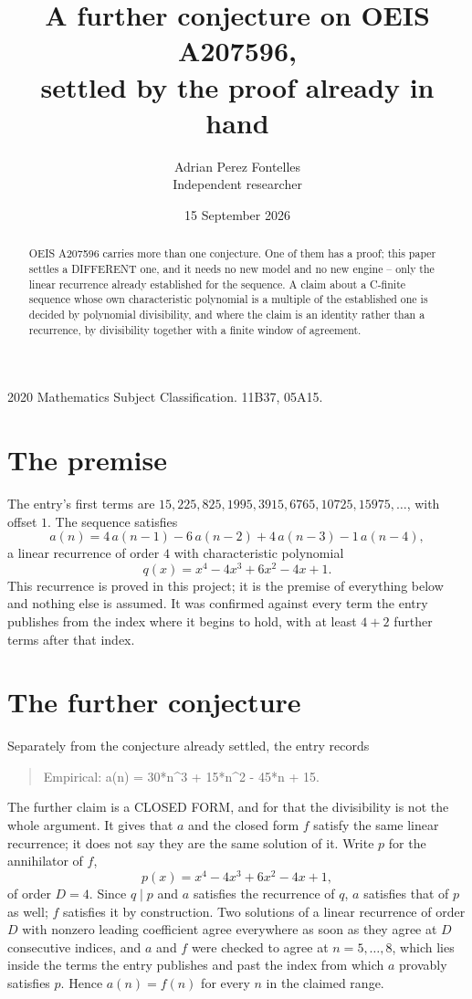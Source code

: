 \documentclass[11pt,a4paper]{article}
\title{A further conjecture on OEIS A207596,\\ \large settled by the proof already in hand}
\author{Adrian Perez Fontelles\\ \small Independent researcher}
\date{15 September 2026}
\theoremstyle{plain}
\theoremstyle{definition}
\begin{document}
\maketitle

\begin{abstract}
OEIS A207596 carries more than one conjecture. One of them has a proof; this paper settles a
DIFFERENT one, and it needs no new model and no new engine -- only the linear recurrence already
established for the sequence. A claim about a C-finite sequence whose own characteristic
polynomial is a multiple of the established one is decided by polynomial divisibility, and where
the claim is an identity rather than a recurrence, by divisibility together with a finite window
of agreement.
\end{abstract}

\noindent\small 2020 Mathematics Subject Classification. 11B37, 05A15.\normalsize

\section{The premise}

The entry's first terms are $15, 225, 825, 1995, 3915, 6765, 10725, 15975,\dots$, with offset $1$. The sequence satisfies
\[
  a(n)=4\,a(n-1) - 6\,a(n-2) + 4\,a(n-3) - 1\,a(n-4) ,
\]
a linear recurrence of order $4$ with characteristic polynomial
\[
  q(x)=x^{4} - 4 x^{3} + 6 x^{2} - 4 x + 1 .
\]
This recurrence is proved in this project; it is the premise of everything below and nothing else is assumed.
It was confirmed against every term the entry publishes from the index where it begins to hold,
with at least $4+2$ further terms after that index.

\section{The further conjecture}

Separately from the conjecture already settled, the entry records

\begin{quote}\raggedright Empirical: a(n) = 30*n\^{}3 + 15*n\^{}2 - 45*n + 15.\end{quote}

The further claim is a CLOSED FORM, and for that the divisibility is not the whole argument. It
gives that $a$ and the closed form $f$ satisfy the same linear recurrence; it does not say they
are the same solution of it. Write $p$ for the annihilator of $f$,
\[
  p(x)=x^{4} - 4 x^{3} + 6 x^{2} - 4 x + 1 ,
\]
of order $D=4$. Since $q\mid p$ and $a$ satisfies the recurrence of $q$, $a$ satisfies that of
$p$ as well; $f$ satisfies it by construction. Two solutions of a linear recurrence of order $D$
with nonzero leading coefficient agree everywhere as soon as they agree at $D$ consecutive
indices, and $a$ and $f$ were checked to agree at $n=5,\dots,8$,
which lies inside the terms the entry publishes and past the index from which $a$ provably
satisfies $p$. Hence $a(n)=f(n)$ for every $n$ in the claimed range.
\end{document}

